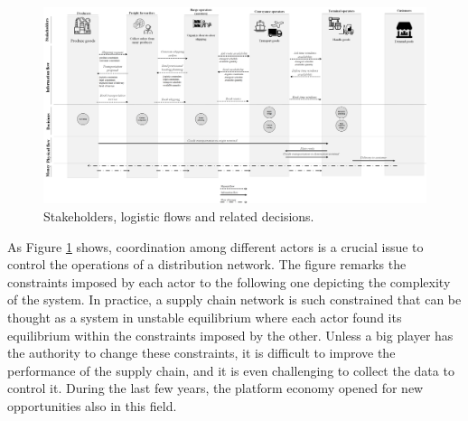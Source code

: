 \begin{landscape}
\thispagestyle{empty}
\begin{figure}[hbt!]
\centering
\includegraphics[width=1.7\textwidth]{SectionDistribution/control_figures/fig_actors.png}
\captionsetup{type=figure}
\caption{Stakeholders, logistic flows and related decisions.}
\label{fig_actors}
\end{figure}
\end{landscape}

As Figure \ref{fig_actors} shows, coordination among different actors is a crucial issue to control the operations of a distribution network. The figure remarks the constraints imposed by each actor to the following one depicting the complexity of the system. In practice, a supply chain network is such constrained that can be thought as a system in unstable equilibrium where each actor found its equilibrium within the constraints imposed by the other. Unless a big player has the authority to change these constraints, it is difficult to improve the performance of the supply chain, and it is even challenging to collect the data to control it. During the last few years, the platform economy opened for new opportunities also in this field.\par


